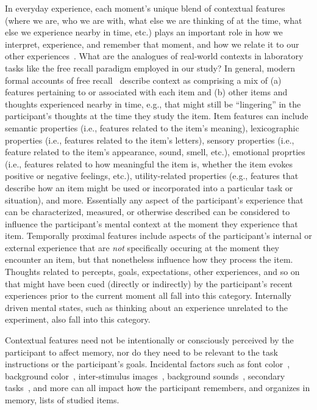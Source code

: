 \documentclass[11pt]{article}
\begin{document}
In everyday experience, each moment's unique blend of contextual features
(where we are, who we are with, what else we are thinking of at the time, what
else we experience nearby in time, etc.) plays an important role in how we
interpret, experience, and remember that moment, and how we relate it to our
other experiences~\citep[e.g., for review see ][]{Mann20}. What are the
analogues of real-world contexts in laboratory tasks like the free recall
paradigm employed in our study? In general, modern formal accounts of free
recall~\citep{Kaha20} describe context as comprising a mix of (a) features
pertaining to or associated with each item and (b) other items and thoughts
experienced nearby in time, e.g., that might still be ``lingering'' in the
participant's thoughts at the time they study the item. Item features can
include semantic properties (i.e., features related to the item's meaning),
lexicographic properties (i.e., features related to the item's letters),
sensory properties (i.e., feature related to the item's appearance, sound,
smell, etc.), emotional proprties (i.e., features related to how meaningful the
item is, whether the item evokes positive or negative feelings, etc.),
utility-related properties (e.g., features that describe how an item might be
used or incorporated into a particular task or situation), and more.
Essentially any aspect of the participant's experience that can be
characterized, measured, or otherwise described can be considered to influence
the participant's mental context at the moment they experience that item.
Temporally proximal features include aspects of the participant's internal or
external experience that are \textit{not} specifically occuring at the moment
they encounter an item, but that nonetheless influence how they process the
item. Thoughts related to percepts, goals, expectations, other experiences, and
so on that might have been cued (directly or indirectly) by the participant's
recent experiences prior to the current moment all fall into this category.
Internally driven mental states, such as thinking about an experience unrelated
to the experiment, also fall into this category.

Contextual features need not be intentionally or consciously perceived by the
participant to affect memory, nor do they need to be relevant to the task
instructions or the participant's goals. Incidental factors such as font
color~\citep{JonePyc14}, background color~\citep{IsarIsar07}, inter-stimulus
images~\citep{GersEtal13, MannEtal16, ChiuEtal21}, background
sounds~\citep{BeamJone10, SahaSmit14}, secondary tasks~\citep{MasiSaha14,
PolyEtal09}, and more can all impact how the participant remembers, and
organizes in memory, lists of studied items.
\end{document}
